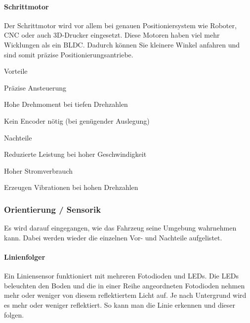 \documentclass[../main.tex]{subfiles}
\begin{document}
\paragraph{Schrittmotor}

Der Schrittmotor wird vor allem bei genauen Positioniersystem wie Roboter, CNC oder auch 3D-Drucker eingesetzt. Diese Motoren haben viel mehr Wicklungen als ein BLDC. Dadurch können Sie kleinere Winkel anfahren und sind somit präzise Positionierungsantriebe. 

\begin{minipage}[t]{0.48\textwidth}
\begin{items}
  \item [Vorteile]
  \item Präzise Ansteuerung
  \item Hohe Drehmoment bei tiefen Drehzahlen
  \item Kein Encoder nötig (bei genügender Auslegung)
\end{items}
\end{minipage}
\hfill
\begin{minipage}[t]{0.48\textwidth}
\begin{items}
  \item [Nachteile]
  \item Reduzierte Leistung bei hoher Geschwindigkeit
  \item Hoher Stromverbrauch
  \item Erzeugen Vibrationen bei hohen Drehzahlen
\end{items}
\end{minipage}

\subsubsection{Orientierung / Sensorik}

Es wird darauf eingegangen, wie das Fahrzeug seine Umgebung wahrnehmen kann. Dabei werden wieder die einzelnen Vor- und Nachteile aufgelistet.

\paragraph{Linienfolger}
Ein Liniensensor funktioniert mit mehreren Fotodioden und LEDs. Die LEDs beleuchten den Boden und die in einer Reihe angeordneten Fotodioden nehmen mehr oder weniger von diesem reflektiertem Licht auf. Je nach Untergrund wird es mehr oder weniger reflektiert. So kann man die Linie erkennen und dieser folgen.
 
\end{document}
